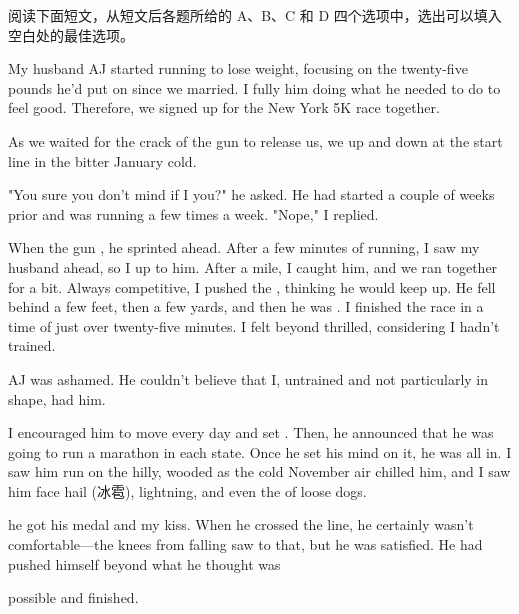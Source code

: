 \documentclass{英语试卷}
\begin{document}
\par 阅读下面短文，从短文后各题所给的 A、B、C 和 D 四个选项中，选出可以填入空白处的最佳选项。\par
\par My husband AJ started running to lose weight, focusing on the twenty-five pounds he'd put on since we married. I fully  him doing what he needed to do to feel good. Therefore, we signed up for the New York 5K race together.\par
\par As we waited for the crack of the gun to release us, we  up and down at the start line in the bitter January cold.\par
\par "You sure you don't mind if I  you?" he asked. He had started  a couple of weeks prior and was running a few times a week. "Nope," I replied.\par
\par When the gun , he sprinted ahead. After a few minutes of running, I saw my husband ahead, so I  up to him. After a mile, I caught him, and we ran together for a bit. Always competitive, I pushed the , thinking he would keep up. He fell behind a few feet, then a few yards, and then he was . I finished the race in a  time of just over twenty-five minutes. I felt beyond thrilled, considering I hadn't trained.\par
\par AJ was ashamed. He couldn't believe that I, untrained and not particularly in shape, had  him.\par
\par I encouraged him to move every day and set . Then, he announced that he was going to run a marathon in each state. Once he set his mind on it, he was all in. I saw him run on the hilly, wooded  as the cold November air chilled him, and I saw him face hail (冰雹), lightning, and even the  of loose dogs.\par
\par {} he got his medal and my kiss. When he crossed the line, he certainly wasn't comfortable—the  knees from falling saw to that, but he was satisfied. He had pushed himself beyond what he thought was\par
\par possible and finished.\par
\end{document}
